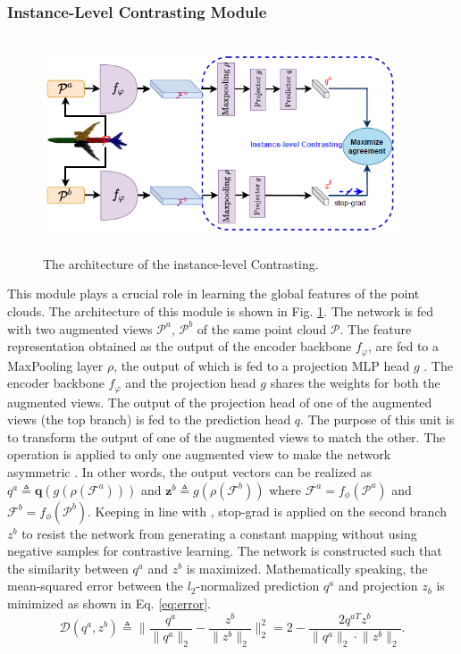 \subsubsection{Instance-Level Contrasting Module}
\begin{figure}[t]
    \centering
    \includegraphics[width=300pt,height=180pt]{pictures/ConClu.png}
    \caption{The architecture of the instance-level Contrasting.\cite{mei2022unsupervised}}
    \label{fig:global_level}
\end{figure} 
This module plays a crucial role in learning the global features of the point clouds. The architecture of this module is shown in Fig. \ref{fig:global_level}. The network is fed with two augmented views $\mathcal{P}^a$, $\mathcal{P}^b$ of the same point cloud $\mathcal{P}$. The feature representation obtained as the output of the encoder backbone $f_{\varphi}$, are fed to a MaxPooling layer $\rho$, the output of which is fed to a projection \ac{MLP} head $g$ \cite{chen2021exploring}. The encoder backbone $f_{\varphi}$ and the projection head $g$ shares the weights for both the augmented views. The output of the projection head of one of the augmented views (the top branch) is fed to the prediction head $q$. The purpose of this unit is to transform the output of one of the augmented views to match the other. The operation is applied to only one augmented view to make the network asymmetric \cite{grill2020bootstrap}. In other words, the output vectors can be realized as  $ \mathit{q^a} \triangleq \mathit{\mathbf{q}(g(\rho(\mathbf{\mathcal{F}}^a)))}$ and $\mathit{\mathbf{z}^b} \triangleq \mathit{g(\rho(\mathbf{\mathcal{F}}^b))}$ where $\mathbf{\mathcal{F}}^a = f_{\phi}(\mathbf{\mathcal{P}}^a)$ and $\mathbf{\mathcal{F}}^b = f_{\phi}(\mathbf{\mathcal{P}}^b)$. Keeping in line with \cite{chen2021exploring}, \ac{stop-grad} is applied on the second branch $z^b$ to resist the network from generating a constant mapping without using negative samples for contrastive learning. The network is constructed such that the similarity between $\mathit{q^a}$ and $\mathit{z^b}$ is maximized. Mathematically speaking, the mean-squared error between the $\mathit{l}_2$-normalized prediction $q^a$ and projection $\mathit{z_b}$ is minimized as shown in Eq. \ref{eq:error}. 
\begin{equation}
    \label{eq:error}
    \mathcal{D}(\mathit{q^a, z^b}) \triangleq \lVert \frac{\mathit{q^a}}{\lVert \mathit{q^a} \rVert _2} - \frac{\mathit{z^b}}{\lVert \mathit{z^b} \rVert _2} \rVert _2^2 = 2 - \frac{2\mathit{q^{aT}z^b}}{\lVert q^a \rVert _2 \cdot \lVert z^b \rVert _2}.
\end{equation}

